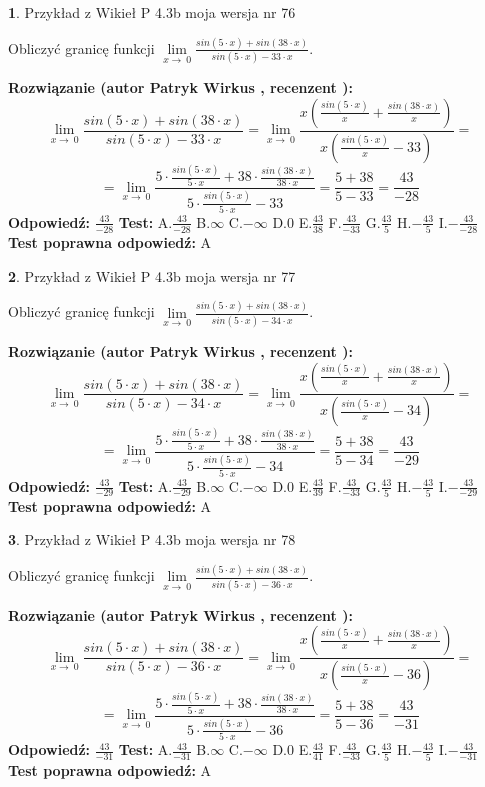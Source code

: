 \documentclass[12pt, a4paper]{article}
\theoremstyle{definition} %
\newtheorem{zad}{}
\newcommand{\zadStart}[1]{\begin{zad}#1\newline}
\newcommand{\zadStop}{\end{zad}}
\newcommand{\rozwStart}[2]{\noindent \textbf{Rozwiązanie (autor #1 , recenzent #2): }\newline}
\newcommand{\rozwStop}{\newline}
\newcommand{\odpStart}{\noindent \textbf{Odpowiedź:}\newline}
\newcommand{\odpStop}{\newline}
\newcommand{\testStart}{\noindent \textbf{Test:}\newline}
\newcommand{\testStop}{\newline}
\newcommand{\kluczStart}{\noindent \textbf{Test poprawna odpowiedź:}\newline}
\newcommand{\kluczStop}{\newline}
\begin{document}
\zadStart{Przykład z Wikieł P 4.3b moja wersja nr 76}


Obliczyć granicę funkcji $\lim\limits_{x\to\ 0}\frac{sin(5 \cdot x)+sin(38 \cdot x)}{sin(5 \cdot x)-33 \cdot x}$.
\zadStop
\rozwStart{Patryk Wirkus}{}
$$\lim\limits_{x\to\ 0}\frac{sin(5 \cdot x)+sin(38 \cdot x)}{sin(5 \cdot x)-33 \cdot x}=\lim\limits_{x\to\ 0}\frac{x(\frac{sin(5 \cdot x)}{x}+\frac{sin(38 \cdot x)}{x})}{x(\frac{sin(5 \cdot x)}{x}-33)}=$$
$$=\lim\limits_{x\to\ 0}\frac{5 \cdot \frac{sin(5 \cdot x)}{5 \cdot x}+38 \cdot \frac{sin(38 \cdot x)}{38 \cdot x}}{5 \cdot \frac{sin(5 \cdot x)}{5 \cdot x}-33}=\frac{5+38}{5-33} = \frac{43}{-28}$$
\rozwStop
\odpStart
$\frac{43}{-28}$
\odpStop
\testStart
A.$\frac{43}{-28}$
B.$\infty$
C.$-\infty$
D.$0$
E.$\frac{43}{38}$
F.$\frac{43}{-33}$
G.$\frac{43}{5}$
H.$-\frac{43}{5}$
I.$-\frac{43}{-28}$
\testStop
\kluczStart
A
\kluczStop



\zadStart{Przykład z Wikieł P 4.3b moja wersja nr 77}


Obliczyć granicę funkcji $\lim\limits_{x\to\ 0}\frac{sin(5 \cdot x)+sin(38 \cdot x)}{sin(5 \cdot x)-34 \cdot x}$.
\zadStop
\rozwStart{Patryk Wirkus}{}
$$\lim\limits_{x\to\ 0}\frac{sin(5 \cdot x)+sin(38 \cdot x)}{sin(5 \cdot x)-34 \cdot x}=\lim\limits_{x\to\ 0}\frac{x(\frac{sin(5 \cdot x)}{x}+\frac{sin(38 \cdot x)}{x})}{x(\frac{sin(5 \cdot x)}{x}-34)}=$$
$$=\lim\limits_{x\to\ 0}\frac{5 \cdot \frac{sin(5 \cdot x)}{5 \cdot x}+38 \cdot \frac{sin(38 \cdot x)}{38 \cdot x}}{5 \cdot \frac{sin(5 \cdot x)}{5 \cdot x}-34}=\frac{5+38}{5-34} = \frac{43}{-29}$$
\rozwStop
\odpStart
$\frac{43}{-29}$
\odpStop
\testStart
A.$\frac{43}{-29}$
B.$\infty$
C.$-\infty$
D.$0$
E.$\frac{43}{39}$
F.$\frac{43}{-33}$
G.$\frac{43}{5}$
H.$-\frac{43}{5}$
I.$-\frac{43}{-29}$
\testStop
\kluczStart
A
\kluczStop



\zadStart{Przykład z Wikieł P 4.3b moja wersja nr 78}


Obliczyć granicę funkcji $\lim\limits_{x\to\ 0}\frac{sin(5 \cdot x)+sin(38 \cdot x)}{sin(5 \cdot x)-36 \cdot x}$.
\zadStop
\rozwStart{Patryk Wirkus}{}
$$\lim\limits_{x\to\ 0}\frac{sin(5 \cdot x)+sin(38 \cdot x)}{sin(5 \cdot x)-36 \cdot x}=\lim\limits_{x\to\ 0}\frac{x(\frac{sin(5 \cdot x)}{x}+\frac{sin(38 \cdot x)}{x})}{x(\frac{sin(5 \cdot x)}{x}-36)}=$$
$$=\lim\limits_{x\to\ 0}\frac{5 \cdot \frac{sin(5 \cdot x)}{5 \cdot x}+38 \cdot \frac{sin(38 \cdot x)}{38 \cdot x}}{5 \cdot \frac{sin(5 \cdot x)}{5 \cdot x}-36}=\frac{5+38}{5-36} = \frac{43}{-31}$$
\rozwStop
\odpStart
$\frac{43}{-31}$
\odpStop
\testStart
A.$\frac{43}{-31}$
B.$\infty$
C.$-\infty$
D.$0$
E.$\frac{43}{41}$
F.$\frac{43}{-33}$
G.$\frac{43}{5}$
H.$-\frac{43}{5}$
I.$-\frac{43}{-31}$
\testStop
\kluczStart
A
\kluczStop
\end{document}
